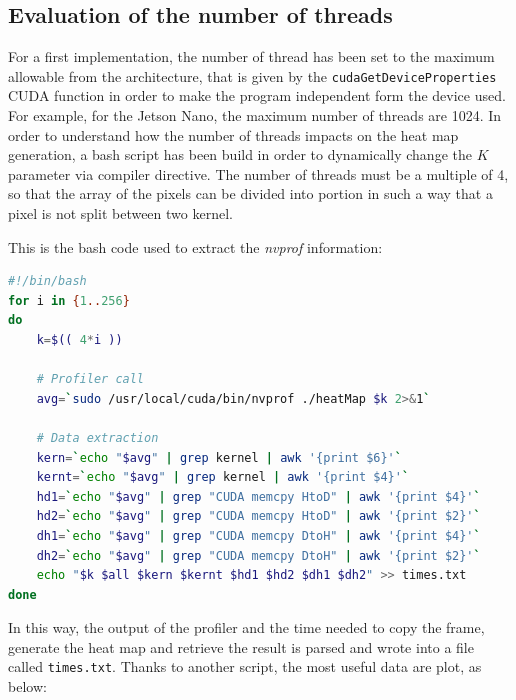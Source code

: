 \documentclass[paper=a4, fontsize=10pt]{scrartcl}	%
\begin{document}
	
	\subsection{Evaluation of the number of threads}
	\label{sec:thread_n}
	For a first implementation, the number of thread has been set to the maximum allowable from the architecture, that is given by the \texttt{cudaGetDeviceProperties} CUDA function in order to make the program independent form the device used. For example, for the Jetson Nano, the maximum number of threads are 1024.\newline\newline
	In order to understand how the number of threads impacts on the heat map generation, a bash script has been build in order to dynamically change the $K$ parameter via compiler directive. The number of threads must be a multiple of 4, so that the array of the pixels can be divided into portion in such a way that a pixel is not split between two kernel.
	
	This is the bash code used to extract the \textit{nvprof} information:
	\begin{lstlisting}[language=bash]
#!/bin/bash
for i in {1..256}
do
	k=$(( 4*i ))
	
	# Profiler call
	avg=`sudo /usr/local/cuda/bin/nvprof ./heatMap $k 2>&1`
	
	# Data extraction
	kern=`echo "$avg" | grep kernel | awk '{print $6}'`
	kernt=`echo "$avg" | grep kernel | awk '{print $4}'`
	hd1=`echo "$avg" | grep "CUDA memcpy HtoD" | awk '{print $4}'`
	hd2=`echo "$avg" | grep "CUDA memcpy HtoD" | awk '{print $2}'`
	dh1=`echo "$avg" | grep "CUDA memcpy DtoH" | awk '{print $4}'`
	dh2=`echo "$avg" | grep "CUDA memcpy DtoH" | awk '{print $2}'`
	echo "$k $all $kern $kernt $hd1 $hd2 $dh1 $dh2" >> times.txt
done\end{lstlisting}
	In this way, the output of the profiler and the time needed to copy the frame, generate the heat map and retrieve the result is parsed and wrote into a file called \texttt{times.txt}. Thanks to another script, the most useful data are plot, as below:
	
\end{document}
